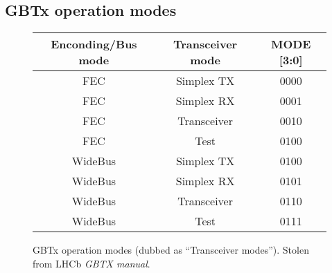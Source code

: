 \subsection{GBTx operation modes} \label{appx:4bit}
\begin{figure}[ht]
    \centering
    \begin{tabular}{ccc}
        \toprule
        Enconding/Bus mode & Transceiver mode & MODE [3:0] \\
        \midrule
        FEC & Simplex TX  & 0000 \\
        FEC & Simplex RX  & 0001 \\
        FEC & Transceiver & 0010 \\
        FEC & Test        & 0100 \\
        WideBus & Simplex TX  & 0100 \\
        WideBus & Simplex RX  & 0101 \\
        WideBus & Transceiver & 0110 \\
        WideBus & Test        & 0111 \\
        \bottomrule
    \end{tabular}
    \caption{
        GBTx operation modes (dubbed as ``Transceiver modes'').
        Stolen from LHCb \emph{GBTX manual}.
    }
    \label{tab:gbtx-modes}
\end{figure}
